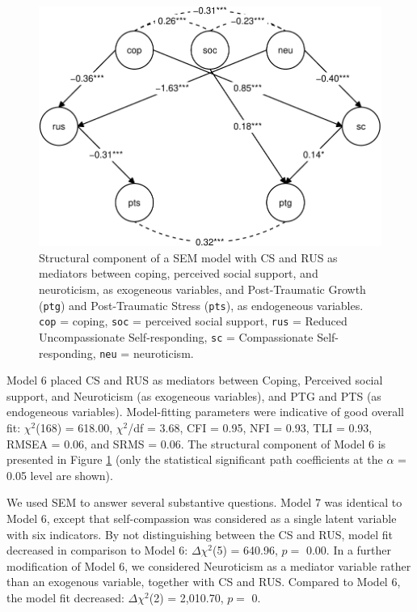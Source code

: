 \documentclass[
  english,
  man,floatsintext]{apa7}
\begin{document}
\begin{figure}
\centering
\includegraphics{validity_self_compassion_files/figure-latex/mediation-model-1.pdf}
\caption{\label{fig:mediation-model}Structural component of a SEM model with CS and RUS as mediators between coping, perceived social support, and neuroticism, as exogeneous variables, and Post-Traumatic Growth (\texttt{ptg}) and Post-Traumatic Stress (\texttt{pts}), as endogeneous variables. \texttt{cop} = coping, \texttt{soc} = perceived social support, \texttt{rus} = Reduced Uncompassionate Self-responding, \texttt{sc} = Compassionate Self-responding, \texttt{neu} = neuroticism.}
\end{figure}

Model 6 placed CS and RUS as mediators between Coping, Perceived social support, and Neuroticism (as exogeneous variables), and PTG and PTS (as endogeneous variables). Model-fitting parameters were indicative of good overall
fit: \(\chi^2\)(168) = 618.00, \(\chi^2\)/df = 3.68, CFI = 0.95, NFI = 0.93, TLI = 0.93, RMSEA = 0.06, and SRMS = 0.06. The structural component of Model 6 is presented in Figure \ref{fig:mediation-model} (only the statistical significant path coefficients at the \(\alpha\) = 0.05 level are shown).

We used SEM to answer several substantive questions. Model 7 was identical to Model 6, except that self-compassion was considered as a single latent variable with six indicators. By not distinguishing between the CS and RUS, model fit decreased in comparison to Model 6: \(\Delta \chi^2\)(5) = 640.96, \(p =\) 0.00. In a further modification of Model 6, we considered Neuroticism as a mediator variable rather than an exogenous variable, together with CS and RUS. Compared to Model 6, the model fit decreased: \(\Delta \chi^2\)(2) = 2,010.70, \(p =\) 0.
\end{document}

